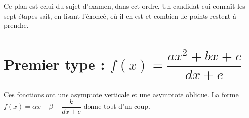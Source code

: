 \begin{remarque}
Ce plan est celui du sujet d'examen, dans cet ordre. Un candidat qui
connaît les sept étapes sait, en lisant l'énoncé, où il en est et combien de
points restent à prendre.
\end{remarque}

\section{Premier type : \texorpdfstring{$f(x) = \dfrac{ax^{2}+bx+c}{dx+e}$}{quotient de degre 2 sur degre 1}}

Ces fonctions ont une asymptote verticale et une asymptote oblique. La forme
$f(x) = \alpha x+\beta+\dfrac{k}{dx+e}$ donne tout d'un coup.

